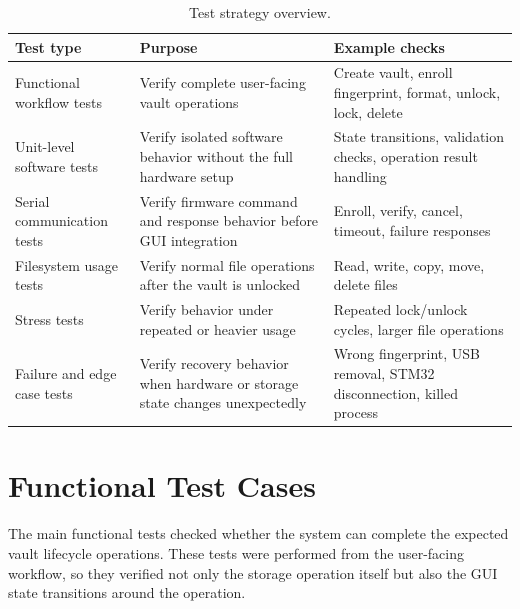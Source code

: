 \begin{table}[!htbp]
\centering
\caption{\label{tab:test-strategy}Test strategy overview.}
\small
\begin{tabularx}{\textwidth}{lXX}
\toprule
Test type & Purpose & Example checks\\
\midrule
Functional workflow tests & Verify complete user-facing vault operations & Create vault, enroll fingerprint, format, unlock, lock, delete\\
Unit-level software tests & Verify isolated software behavior without the full hardware setup & State transitions, validation checks, operation result handling\\
Serial communication tests & Verify firmware command and response behavior before GUI integration & Enroll, verify, cancel, timeout, failure responses\\
Filesystem usage tests & Verify normal file operations after the vault is unlocked & Read, write, copy, move, delete files\\
Stress tests & Verify behavior under repeated or heavier usage & Repeated lock/unlock cycles, larger file operations\\
Failure and edge case tests & Verify recovery behavior when hardware or storage state changes unexpectedly & Wrong fingerprint, USB removal, STM32 disconnection, killed process\\
\bottomrule
\end{tabularx}
\end{table}

\section{Functional Test Cases}

The main functional tests checked whether the system can complete the expected vault lifecycle operations. These tests were performed from the user-facing workflow, so they verified not only the storage operation itself but also the GUI state transitions around the operation.

